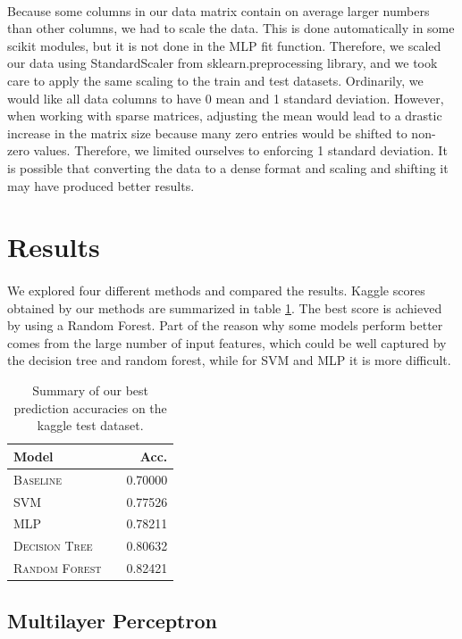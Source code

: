 \documentclass[11pt]{article}
\begin{document}
\paragraph{} Because some columns in our data matrix contain on average larger numbers than other columns, we had to scale the data. This is done automatically in some scikit modules, but it is not done in the MLP fit function. Therefore, we scaled our data using StandardScaler from sklearn.preprocessing library, and we took care to apply the same scaling to the train and test datasets. Ordinarily, we would like all data columns to have 0 mean and 1 standard deviation. However, when working with sparse matrices, adjusting the mean would lead to a drastic increase in the matrix size because many zero entries would be shifted to non-zero values. Therefore, we limited ourselves to enforcing 1 standard deviation. It is possible that converting the data to a dense format and scaling and shifting it may have produced better results. 
\section{Results}
\paragraph{} We explored four different methods and compared the results. Kaggle scores obtained by our methods are summarized in table \ref{tab:results}. The best score is achieved by using a Random Forest. Part of the reason why some models perform better comes from the large number of input features, which could be well captured by the decision tree and random forest, while for SVM and MLP it is more difficult.
  \begin{table}
\centering
\begin{tabular}{llr}
 \toprule
 Model &  & Acc. \\
 \midrule
 \textsc{Baseline} & & 0.70000\\
 \textsc{SVM} & & 0.77526 \\
 \textsc{MLP} & & 0.78211 \\
 \textsc{Decision Tree} & & 0.80632\\
  \textsc{Random Forest} & &0.82421\\
 \bottomrule
\end{tabular}
\caption{\label{tab:results} Summary of our best prediction accuracies on the kaggle test dataset.}
\end{table}
\subsection{Multilayer Perceptron}
\end{document}
